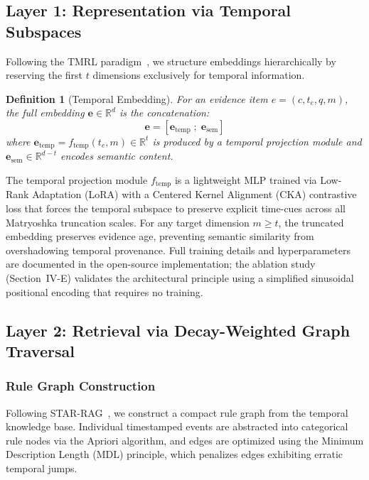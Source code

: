 \documentclass[conference]{IEEEtran}
\newtheorem{definition}{Definition}
\begin{document}
\subsection{Layer 1: Representation via Temporal Subspaces}

Following the TMRL paradigm~\cite{huynh2026tmrl}, we structure embeddings hierarchically by reserving the first $t$ dimensions exclusively for temporal information.

\begin{definition}[Temporal Embedding]
For an evidence item $e = (c, t_e, q, m)$, the full embedding $\mathbf{e} \in \mathbb{R}^d$ is the concatenation:
\begin{equation}
    \mathbf{e} = [\mathbf{e}_{\text{temp}} \;;\; \mathbf{e}_{\text{sem}}]
\end{equation}
where $\mathbf{e}_{\text{temp}} = f_{\text{temp}}(t_e, m) \in \mathbb{R}^t$ is produced by a temporal projection module and $\mathbf{e}_{\text{sem}} \in \mathbb{R}^{d-t}$ encodes semantic content.
\end{definition}

The temporal projection module $f_{\text{temp}}$ is a lightweight MLP trained via Low-Rank Adaptation (LoRA) with a Centered Kernel Alignment (CKA) contrastive loss that forces the temporal subspace to preserve explicit time-cues across all Matryoshka truncation scales. For any target dimension $m \geq t$, the truncated embedding preserves evidence age, preventing semantic similarity from overshadowing temporal provenance. Full training details and hyperparameters are documented in the open-source implementation; the ablation study (Section~IV-E) validates the architectural principle using a simplified sinusoidal positional encoding that requires no training.

\subsection{Layer 2: Retrieval via Decay-Weighted Graph Traversal}

\subsubsection{Rule Graph Construction}

Following STAR-RAG~\cite{zhu2025starrag}, we construct a compact rule graph from the temporal knowledge base. Individual timestamped events are abstracted into categorical rule nodes via the Apriori algorithm, and edges are optimized using the Minimum Description Length (MDL) principle, which penalizes edges exhibiting erratic temporal jumps.
\end{document}
